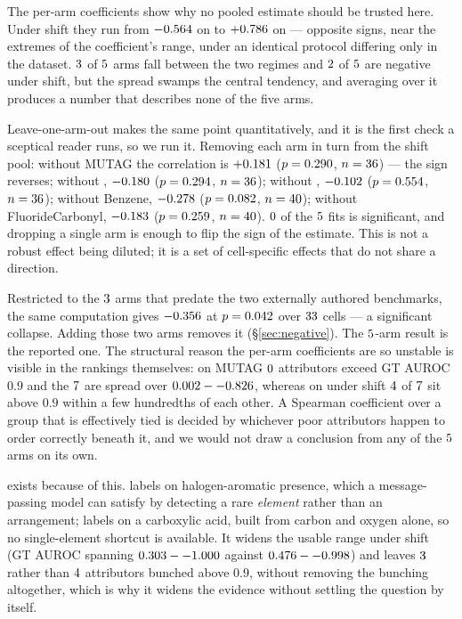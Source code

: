 The per-arm coefficients show why no pooled estimate should be trusted here.
Under shift they run from $-0.564{}$ on \armShiftRhoMinDataset{} to
$+0.786{}$ on \armShiftRhoMaxDataset{} --- opposite signs, near the
extremes of the coefficient's range, under an identical protocol differing only
in the dataset. $3{}$ of $5{}$ arms fall between the two
regimes and $2{}$ of $5{}$ are negative under shift, but
the spread swamps the central tendency, and averaging over it produces a number
that describes none of the five arms.

\ifHasLeaveOneOut
Leave-one-arm-out makes the same point quantitatively, and it is the first
check a sceptical reader runs, so we run it. Removing each arm in turn from the
shift pool: without MUTAG the correlation is $+0.181{}$
($p=0.290{}$, $n=36{}$) --- the sign reverses; without \molDataset{},
$-0.180{}$ ($p=0.294{}$, $n=36{}$); without \hardDataset{},
$-0.102{}$ ($p=0.554{}$, $n=36{}$); without Benzene,
$-0.278{}$ ($p=0.082{}$, $n=40{}$); without
FluorideCarbonyl, $-0.183{}$ ($p=0.259{}$,
$n=40{}$). $0{}$ of the $5{}$ fits is
significant, and dropping a single arm is enough to flip the sign of the
estimate. This is not a robust effect being diluted; it is a set of
cell-specific effects that do not share a direction.
\fi

\ifHasPriorPool
Restricted to the $3{}$ arms that predate the two externally
authored benchmarks, the same computation gives $-0.356{}$ at
$p=0.042{}$ over $33{}$ cells --- a significant
collapse. Adding those two arms removes it (\S\ref{sec:negative}). The
$5{}$-arm result is the reported one.
\fi
The structural reason the per-arm coefficients are so
unstable is visible in the rankings themselves: on MUTAG
$0{}$ attributors exceed GT AUROC $0.9$ and the
$7{}$ are spread over $0.002--0.826{}$, whereas on
\molDataset{} under shift $4{}$ of $7{}$ sit
above $0.9$ within a few hundredths of each other. A Spearman coefficient over
a group that is effectively tied is decided by whichever poor attributors
happen to order correctly beneath it, and we would not draw a conclusion from
any of the $5{}$ arms on its own.

\hardDataset{} exists because of this. \molDataset{} labels on halogen-aromatic
presence, which a message-passing model can satisfy by detecting a rare
\emph{element} rather than an arrangement; \hardDataset{} labels on a
carboxylic acid, built from carbon and oxygen alone, so no single-element
shortcut is available. It widens the usable range under shift (GT AUROC
spanning $0.303--1.000{}$ against $0.476--0.998{}$) and leaves
$3{}$ rather than $4{}$ attributors
bunched above $0.9$, without removing the bunching altogether, which is why it
widens the evidence without settling the question by itself.

